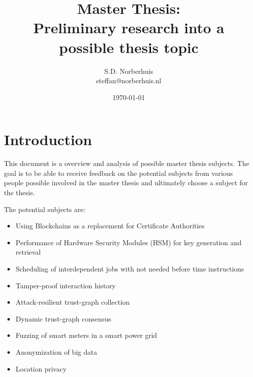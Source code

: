 \documentclass{article}
\title{Master Thesis:\\ Preliminary research into a possible thesis topic}
\author{S.D. Norberhuis\\steffan@norberhuis.nl}
\date{\today}
\begin{document}
\maketitle

\section{Introduction}
This document is a overview and analysis of possible master thesis subjects.
The goal is to be able to receive feedback on the potential subjects from various people possible involved in the master thesis
and ultimately choose a subject for the thesis.

The potential subjects are:
\begin{itemize}
	\item Using Blockchains as a replacement for Certificate Authorities
	\item Performance of Hardware Security Modules (HSM) for key generation and retrieval
	\item Scheduling of interdependent jobs with not needed before time instructions
	\item Tamper-proof interaction history
	\item Attack-resilient trust-graph collection
	\item Dynamic trust-graph consensus
	\item Fuzzing of smart meters in a smart power grid
	\item Anonymization of big data
	\item Location privacy
\end{itemize}
\end{document}
